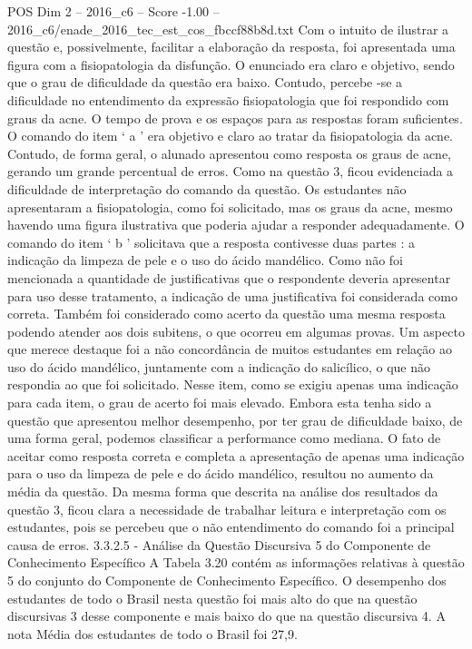 \begin{textsample}{POS Dim 2 – 2016\_c6 – Score -1.00 – 2016\_c6/enade\_2016\_tec\_est\_cos\_fbccf88b8d.txt}
Com o intuito de ilustrar a questão e, possivelmente, facilitar a elaboração da resposta, foi apresentada uma figura com a fisiopatologia da disfunção.
O enunciado era claro e objetivo, sendo que o grau de dificuldade da questão era baixo.
Contudo, percebe -se a dificuldade no entendimento da expressão fisiopatologia que foi respondido com graus da acne.
O tempo de prova e os espaços para as respostas foram suficientes.
O comando do item ‘ a ’ era objetivo e claro ao tratar da fisiopatologia da acne.
Contudo, de forma geral, o alunado apresentou como resposta os graus de acne, gerando um grande percentual de erros.
Como na questão 3, ficou evidenciada a dificuldade de interpretação do comando da questão.
Os estudantes não apresentaram a fisiopatologia, como foi solicitado, mas os graus da acne, mesmo havendo uma figura ilustrativa que poderia ajudar a responder adequadamente.
O comando do item ‘ b ’ solicitava que a resposta contivesse duas partes : a indicação da limpeza de pele e o uso do ácido mandélico.
Como não foi mencionada a quantidade de justificativas que o respondente deveria apresentar para uso desse tratamento, a indicação de uma justificativa foi considerada como correta.
Também foi considerado como acerto da questão uma mesma resposta podendo atender aos dois subitens, o que ocorreu em algumas provas.
Um aspecto que merece destaque foi a não concordância de muitos estudantes em relação ao uso do ácido mandélico, juntamente com a indicação do salicílico, o que não respondia ao que foi solicitado.
Nesse item, como se exigiu apenas uma indicação para cada item, o grau de acerto foi mais elevado.
Embora esta tenha sido a questão que apresentou melhor desempenho, por ter grau de dificuldade baixo, de uma forma geral, podemos classificar a performance como mediana.
O fato de aceitar como resposta correta e completa a apresentação de apenas uma indicação para o uso da limpeza de pele e do ácido mandélico, resultou no aumento da média da questão.
Da mesma forma que descrita na análise dos resultados da questão 3, ficou clara a necessidade de trabalhar leitura e interpretação com os estudantes, pois se percebeu que o não entendimento do comando foi a principal causa de erros. 3.3.2.5 - Análise da Questão Discursiva 5 do Componente de Conhecimento Específico A Tabela 3.20 contém as informações relativas à questão 5 do conjunto do Componente de Conhecimento Específico.
O desempenho dos estudantes de todo o Brasil nesta questão foi mais alto do que na questão discursivas 3 desse componente e mais baixo do que na questão discursiva 4.
A nota Média dos estudantes de todo o Brasil foi 27,9.

\end{textsample}
